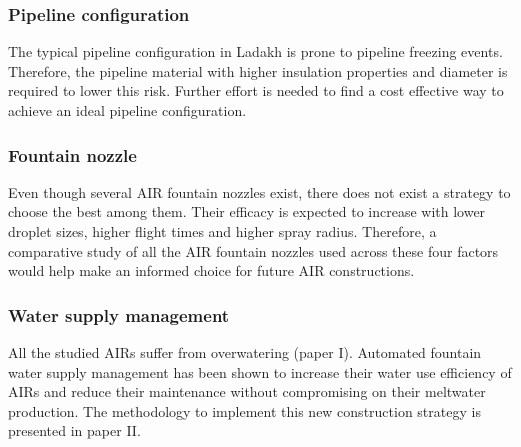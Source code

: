 \subsubsection{Pipeline configuration}

The typical pipeline configuration in Ladakh is prone to pipeline freezing events. Therefore, the pipeline
material with higher insulation properties and diameter is required to lower this risk. Further effort is needed
to find a cost effective way to achieve an ideal pipeline configuration.

\subsubsection{Fountain nozzle}

Even though several AIR fountain nozzles exist, there does not exist a strategy to choose the best among them.
Their efficacy is expected to increase with lower droplet sizes, higher flight times and higher spray radius.
Therefore, a comparative study of all the AIR fountain nozzles used across these four factors would help make an
informed choice for future AIR constructions.

\subsubsection{Water supply management}

All the studied AIRs suffer from overwatering (paper I). Automated fountain water supply management has been
shown to increase their water use efficiency of AIRs and reduce their maintenance without compromising on their
meltwater production. The methodology to implement this new construction strategy is presented in paper II.






